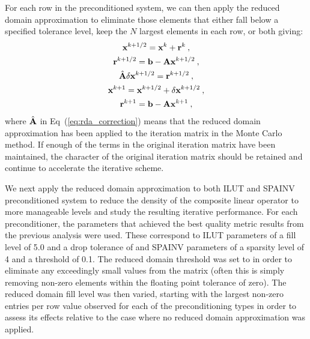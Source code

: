 For each row in the preconditioned system, we can then apply the
reduced domain approximation to eliminate those elements that either
fall below a specified tolerance level, keep the $N$ largest elements
in each row, or both giving:
\begin{subequations}
  \begin{gather}
    \mathbf{x}^{k+1/2} = \mathbf{x}^k + \mathbf{r}^k\:,\\
    \mathbf{r}^{k+1/2} = \mathbf{b} - \mathbf{A}\mathbf{x}^{k+1/2}\:,\\
    \hat{\mathbf{A}}\delta\mathbf{x}^{k+1/2} = \mathbf{r}^{k+1/2}\:, 
    \label{eq:rda_correction}\\
    \mathbf{x}^{k+1} = \mathbf{x}^{k+1/2} + \delta \mathbf{x}^{k+1/2}\:,\\
    \mathbf{r}^{k+1} = \mathbf{b} - \mathbf{A}\mathbf{x}^{k+1}\:,
  \end{gather}
  \label{eq:rda_mcsa}
\end{subequations}
where $\hat{\mathbf{A}}$ in Eq~(\ref{eq:rda_correction}) means that the
reduced domain approximation has been applied to the iteration matrix
in the Monte Carlo method. If enough of the terms in the original
iteration matrix have been maintained, the character of the original
iteration matrix should be retained and continue to accelerate the
iterative scheme. 

We next apply the reduced domain approximation to both ILUT and SPAINV
preconditioned system to reduce the density of the composite linear
operator to more manageable levels and study the resulting iterative
performance. For each preconditioner, the parameters that achieved
the best quality metric results from the previous analysis were
used. These correspond to ILUT parameters of a fill level of 5.0 and a
drop tolerance of  and SPAINV parameters of a sparsity level
of 4 and a threshold of 0.1. The reduced domain threshold was set to
 in order to eliminate any exceedingly small values from
the matrix (often this is simply removing non-zero elements within the
floating point tolerance of zero). The reduced domain fill level was
then varied, starting with the largest non-zero entries per row value
observed for each of the preconditioning types in order to assess its
effects relative to the case where no reduced domain approximation was
applied.

